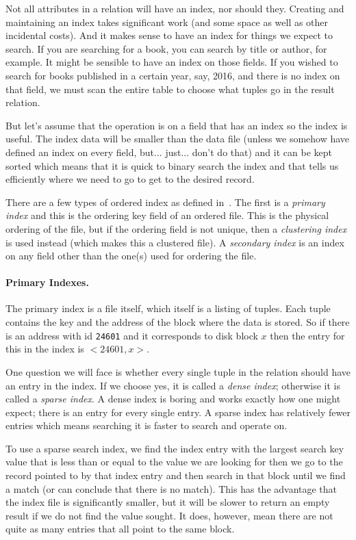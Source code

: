 Not all attributes in a relation will have an index, nor should they. Creating and maintaining an index takes significant work (and some space as well as other incidental costs). And it makes sense to have an index for things we expect to search. If you are searching for a book, you can search by title or author, for example. It might be sensible to have an index on those fields. If you wished to search for books published in a certain year, say, 2016, and there is no index on that field, we must scan the entire table to choose what tuples go in the result relation.

But let's assume that the operation is on a field that has an index so the index is useful. The index data will be smaller than the data file (unless we somehow have defined an index on every field, but... just... don't do that) and it can be kept sorted which means that it is quick to binary search the index and that tells us efficiently where we need to go to get to the desired record.

There are a few types of ordered index as defined in~\cite{fds}. The first is a \textit{primary index} and this is the ordering key field of an ordered file. This is the physical ordering of the file, but if the ordering field is not unique, then a \textit{clustering index} is used instead (which makes this a clustered file). A \textit{secondary index} is an index on any field other than the one(s) used for ordering the file.

\paragraph{Primary Indexes.}
The primary index is a file itself, which itself is a listing of tuples. Each tuple contains the key and the address of the block where the data is stored. So if there is an address with id \texttt{24601} and it corresponds to disk block $x$ then the entry for this in the index is $<24601, x>$. 

One question we will face is whether every single tuple in the relation should have an entry in the index. If we choose yes, it is called a \textit{dense index}; otherwise it is called a \textit{sparse index}. A dense index is boring and works exactly how one might expect; there is an entry for every single entry. A sparse index has relatively fewer entries which means searching it is faster to search and operate on. 

To use a sparse search index, we find the index entry with the largest search key value that is less than or equal to the value we are looking for then we go to the record pointed to by that index entry and then search in that block until we find a match (or can conclude that there is no match). This has the advantage that the index file is significantly smaller, but it will be slower to return an empty result if we do not find the value sought. It does, however, mean there are not quite as many entries that all point to the same block.

